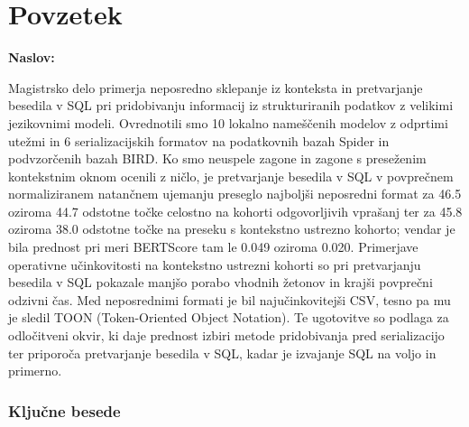\chapter*{Povzetek}

\noindent\textbf{Naslov:} \ttitle
\bigskip

Magistrsko delo primerja neposredno sklepanje iz konteksta in pretvarjanje besedila v SQL pri pridobivanju
informacij iz strukturiranih podatkov z velikimi jezikovnimi modeli. Ovrednotili smo \num{10} lokalno
nameščenih modelov z odprtimi utežmi in \num{6} serializacijskih formatov na podatkovnih bazah Spider in
podvzorčenih bazah BIRD. Ko smo neuspele zagone in zagone s preseženim kontekstnim oknom ocenili z ničlo, je
pretvarjanje besedila v SQL v povprečnem normaliziranem natančnem ujemanju preseglo najboljši neposredni
format za \num{46.5} oziroma \num{44.7} odstotne točke celostno na kohorti odgovorljivih vprašanj ter za
\num{45.8} oziroma \num{38.0} odstotne točke na preseku s kontekstno ustrezno kohorto; vendar je bila prednost
pri meri BERTScore tam le \num{0.049} oziroma \num{0.020}. Primerjave operativne učinkovitosti na kontekstno
ustrezni kohorti so pri pretvarjanju besedila v SQL pokazale manjšo porabo vhodnih žetonov in krajši povprečni
odzivni čas. Med neposrednimi formati je bil najučinkovitejši CSV, tesno pa mu je sledil TOON (Token-Oriented
Object Notation). Te ugotovitve so podlaga za odločitveni okvir, ki daje prednost izbiri metode pridobivanja
pred serializacijo ter priporoča pretvarjanje besedila v SQL, kadar je izvajanje SQL na voljo in primerno.

\subsection*{Ključne besede}
\textit{\tkeywords}
\clearemptydoublepage

